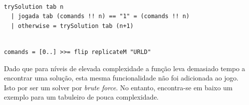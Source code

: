 \documentclass[12pt,a4paper]{report}
\begin{document}
\begin{verbatim}

trySolution tab n
  | jogada tab (comands !! n) == "1" = (comands !! n)
  | otherwise = trySolution tab (n+1)

\end{verbatim}

\begin{verbatim}

comands = [0..] >>= flip replicateM "URLD"

\end{verbatim}

\hfill

\hfill

Dado que para níveis de elevada complexidade a função leva demasiado tempo a encontrar uma solução, esta mesma funcionalidade não foi adicionada ao jogo. Isto por ser um solver por \emph{brute force}. No entanto, encontra-se em baixo um exemplo para um tabuleiro de pouca complexidade.

\hfill
\end{document}

